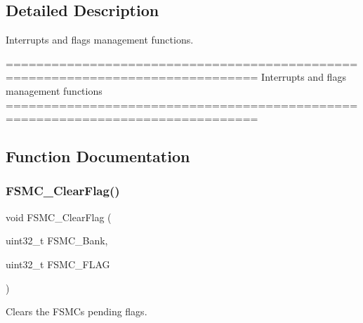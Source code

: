 \subsection{Detailed Description}
Interrupts and flags management functions. 

\begin{DoxyVerb} ===============================================================================
                     Interrupts and flags management functions
 ===============================================================================  \end{DoxyVerb}
 

\subsection{Function Documentation}
\mbox{\label{group__FSMC__Group4_ga697618f2de0ad9a8a82461ddbebd5264}} 
\subsubsection{F\+S\+M\+C\+\_\+\+Clear\+Flag()}
{\footnotesize\ttfamily void F\+S\+M\+C\+\_\+\+Clear\+Flag (\begin{DoxyParamCaption}\item[{uint32\+\_\+t}]{F\+S\+M\+C\+\_\+\+Bank,  }\item[{uint32\+\_\+t}]{F\+S\+M\+C\+\_\+\+F\+L\+AG }\end{DoxyParamCaption})}



Clears the F\+S\+MC\textquotesingle{}s pending flags. 



